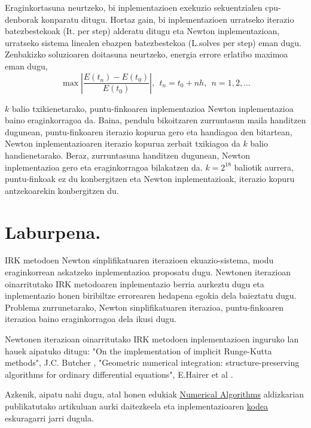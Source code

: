Eraginkortasuna neurtzeko, bi inplementazioen exekuzio sekuentzialen cpu-denborak  konparatu ditugu. Hortaz gain, bi inplementazioen urratseko iterazio batezbestekoak (It. per step) alderatu ditugu eta Newton inplementazioan, urratseko sistema linealen ebazpen batezbestekoa (L.solves per step) eman dugu. Zenbakizko soluzioaren doitasuna neurtzeko, energia errore erlatibo maximoa eman dugu,
\begin{equation*}
\max | \frac{E(t_n)-E(t_0)}{E(t_0)}|, \ \  t_n=t_0+nh, \ \ n=1,2,\dots
\end{equation*} 

$k$ balio txikienetarako, puntu-finkoaren inplementazioa Newton inplementazioa baino eraginkorragoa da. Baina, pendulu bikoitzaren zurruntasun maila handitzen dugunean, puntu-finkoaren iterazio kopurua gero eta handiagoa den bitartean, Newton inplementazioaren iterazio kopurua zerbait txikiagoa da $k$ balio handienetarako. Beraz, zurruntasuna handitzen dugunean, Newton inplementazioa gero eta eraginkorragoa bilakatzen da. $k=2^{18}$ baliotik aurrera, puntu-finkoak ez du konbergitzen eta Newton inplementazioak, iterazio kopuru antzekoarekin konbergitzen du.

 



\section{Laburpena.}

IRK metodoen Newton sinplifikatuaren iterazioen ekuazio-sistema, modu eraginkorrean askatzeko inplementazioa proposatu dugu. Newtonen iterazioan oinarritutako IRK metodoaren inplementazio berria aurkeztu dugu eta inplementazio honen biribiltze errorearen hedapena egokia dela baieztatu dugu. Problema zurrunetarako, Newton sinplifikatuaren iterazioa, puntu-finkoaren iterazioa baino eraginkorragoa dela ikusi dugu.

Newtonen iterazioan oinarritutako IRK metodoen inplementazioen inguruko lan hauek aipatuko ditugu: "On the implementation of implicit Runge-Kutta methods", J.C. Butcher \cite{Butcher1976}, "Geometric numerical integration: structure-preserving algorithms for ordinary differential equations", E.Hairer et al \cite{Hairer2006}.

Azkenik, aipatu nahi dugu, atal honen edukiak \href{http://link.springer.com/journal/11075}{Numerical Algorithms} aldizkarian publikatutako \cite{Antonana2017a} artikuluan aurki daitezkeela eta inplementazioaren \href{https://github.com/mikelehu/IRK-Newton}{kodea} eskuragarri jarri dugula.
